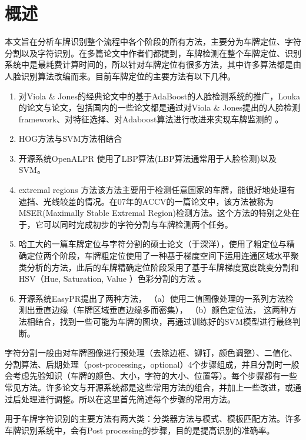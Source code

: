 \section{概述}
本文旨在分析车牌识别整个流程中各个阶段的所有方法，主要分为车牌定位、字符分割以及字符识别。在多篇论文中作者们都提到，车牌检测在整个车牌定位、识别系统中是最耗费计算时间的，所以针对车牌定位有很多方法，其中许多算法都是由人脸识别算法改编而来。目前车牌定位的主要方法有以下几种。
\begin{enumerate}
\item
对Viola \& Jones的经典论文\cite{rrt_face_detection}中的基于AdaBoost的人脸检测系统的推广，Louka的论文\cite{plate_dection_using_adaboost}与论文\cite{rtl_plate_recoginition_on_edsp}，包括国内的一些论文都是通过对Viola \& Jones提出的人脸检测framework、对特征选择、对Adaboost算法进行改进来实现车牌监测的 。
\item
HOG方法与SVM方法相结合
\item
开源系统OpenALPR 使用了LBP算法(LBP算法通常用于人脸检测)以及SVM。
\item
extremal regions 方法\cite{un_lic_plate_and_text}该方法主要用于检测任意国家的车牌，能很好地处理有遮挡、光线较差的情况。在07年的ACCV的一篇论文中，该方法被称为MSER(Maximally Stable Extremal Region)检测方法。这个方法的特别之处在于，它可以同时完成初步的字符分割与车牌检测两个任务。
\item
哈工大的一篇车牌定位与字符分割的硕士论文（于深洋），使用了粗定位与精确定位两个阶段，车牌粗定位使用了一种基于梯度空间下运用连通区域水平聚类分析的方法，此后的车牌精确定位阶段采用了基于车牌梯度宽度跳变分割和 HSV（Hue, Saturation, Value ）色彩分割的方法 。
\item
开源系统EasyPR提出了两种方法，
（a）使用二值图像处理的一系列方法检测出垂直边缘（车牌区域垂直边缘多而密集），
（b）颜色定位法，
这两种方法相结合，找到一些可能为车牌的图块，再通过训练好的SVM模型进行最终判断。
\end{enumerate}

字符分割一般由对车牌图像进行预处理（去除边框、铆钉，颜色调整）、二值化、分割算法、后期处理（post-processing，optional）4个步骤组成，并且分割时一般会考虑先验知识（车牌的颜色、大小，字符的大小、位置等）。每个步骤都有一些常见方法。许多论文与开源系统都是这些常用方法的组合，并加上一些改进，或通过后处理进行调整。所以在这里首先简述每个步骤的常用方法。

用于车牌字符识别的主要方法有两大类：分类器方法与模式、模板匹配方法。许多车牌识别系统中，会有Post processing的步骤，目的是提高识别的准确率。